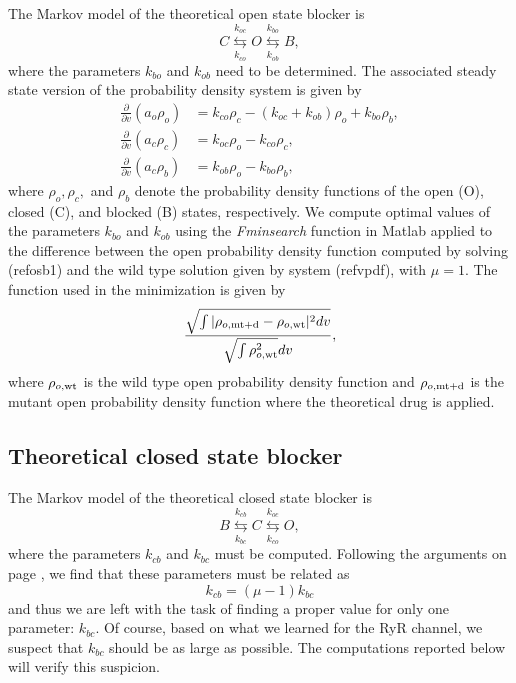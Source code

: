 The Markov model of the theoretical open state blocker is
\begin{equation}
C\underset{k_{co}}{\overset{k_{oc}}{\leftrightarrows}}O\underset{k_{ob}
}{\overset{k_{bo}}{\leftrightarrows}}B, \label{ob1}
\end{equation}
where the parameters $k_{bo}$ and $k_{ob}$ need to be determined. The
associated steady state version of the probability density system is given by
\begin{align}
\frac{\partial}{\partial v}\left(  a_{o}\rho_{o}\right)   &  =k_{co}\rho
_{c}-\left(  k_{oc}+k_{ob}\right)  \rho_{o}+k_{bo}\rho_{b},\nonumber\\
\frac{\partial}{\partial v}\left(  a_{c}\rho_{c}\right)   &  =k_{oc}\rho
_{o}-k_{co}\rho_{c},\label{osb1}\\
\frac{\partial}{\partial v}\left(  a_{c}\rho_{b}\right)   &  =k_{ob}\rho
_{o}-k_{bo}\rho_{b},\nonumber
\end{align}
where $\rho_{o},\rho_{c},$ and $\rho_{b}$ denote the probability density
functions of the open (O), closed (C), and blocked (B) states, respectively. We
compute optimal values of the parameters $k_{bo}$ and $k_{ob}$ using the
{\it Fminsearch} function in Matlab applied to the difference between the open
probability density function computed by solving (ref{osb1})
and the wild type solution given by system (ref{vpdf}),
with $\mu=1.$  The function used in the minimization is given by
\[ \frac{\sqrt{\int |\rho_{o,\rm{mt+d}}-\rho_{o,\rm{wt}}|^2 dv}}{ \sqrt{\int \rho^2_{o,\rm{wt}}}dv}, \]
where $\rho_{o,\rm{wt}}$ is the wild type open probability density function and $\rho_{o,\rm{mt+d}}$
is the mutant open probability density function where the theoretical drug is applied.

\subsection{Theoretical closed state blocker}


\bigskip The Markov model of the theoretical closed state blocker is
\begin{equation}
B\underset{k_{bc}}{\overset{k_{cb}}{\leftrightarrows}}C\underset{k_{co}
}{\overset{k_{oc}}{\leftrightarrows}}O, \label{vcb}
\end{equation}
where the parameters $k_{cb}$ and $k_{bc}$ must be computed. Following the
arguments on page \pageref{sec:eq-closed}, we find that these parameters must be
related as
\begin{equation}
k_{cb}=\left(  \mu-1\right)  k_{bc} \label{kcbv}
\end{equation}
and thus we are left with the task of finding a proper value for only one
parameter: $k_{bc}.$ Of course, based on what we learned for the RyR channel,
we suspect that $k_{bc}$ should be as large as possible. The computations 
reported below will verify this suspicion.


